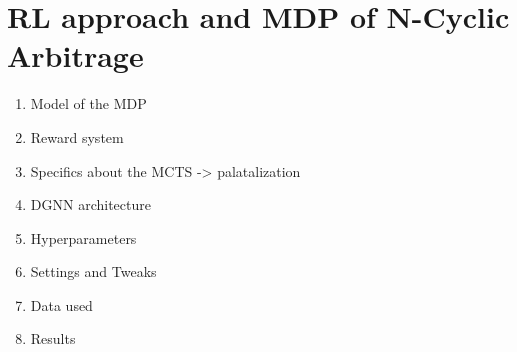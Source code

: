 \section{RL approach and MDP of N-Cyclic Arbitrage}
\begin{enumerate}
    \item Model of the MDP
    \item Reward system
    \item Specifics about the MCTS -> palatalization
    \item DGNN architecture
    \item Hyperparameters
    \item Settings and Tweaks
    \item Data used
    \item Results
\end{enumerate}




